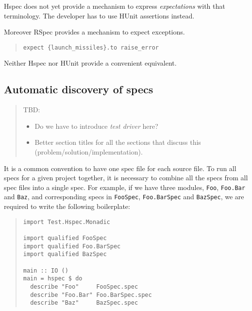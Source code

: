 \documentclass[preprint]{sigplanconf}
\begin{document}
\noindent Hspec does not yet provide a mechanism to express
\emph{expectations} with that terminology.  The developer has to use
HUnit assertions instead.

Moreover RSpec provides a mechanism to expect exceptions.

\begin{quote}
\small
\begin{verbatim}
expect {launch_missiles}.to raise_error
\end{verbatim}
\end{quote}

\noindent Neither Hspec nor HUnit provide a convenient equivalent.

\subsection{Automatic discovery of specs}
\label{sec:problem-discovery}

\begin{quote}
    TBD:

    \begin{itemize}
        \item Do we have to introduce \emph{test driver} here?
        \item Better section titles for all the sections that discuss
            this (problem/solution/implementation).
    \end{itemize}
\end{quote}

It is a common convention to have one spec file for each source file.
To run all specs for a given project together, it is necessary to
combine all the specs from all spec files into a single spec.  For
example, if we have three modules, \verb|Foo|, \verb|Foo.Bar| and
\verb|Baz|, and corresponding specs in \verb|FooSpec|,
\verb|Foo.BarSpec| and \verb|BazSpec|, we are required to write the
following boilerplate:

\begin{quote}
\small
\begin{verbatim}
import Test.Hspec.Monadic

import qualified FooSpec
import qualified Foo.BarSpec
import qualified BazSpec

main :: IO ()
main = hspec $ do
  describe "Foo"     FooSpec.spec
  describe "Foo.Bar" Foo.BarSpec.spec
  describe "Baz"     BazSpec.spec
\end{verbatim}
\end{quote}
\end{document}
